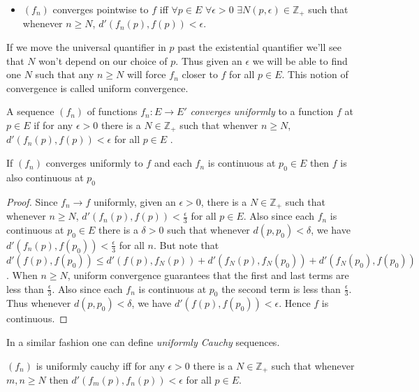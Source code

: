\begin{itemize}
    \item $\left(f_n\right)$ converges pointwise to $f$ iff $\forall p \in E$ $\forall \epsilon > 0$
	$\exists N(p,\epsilon) \in \mathbb{Z}_+$ such that whenever $n \geq N$, $d'(f_n(p),f(p)) < 
	\epsilon$.
\end{itemize}
If we move the universal quantifier in $p$ past the existential quantifier we'll see that $N$ won't
depend on our choice of $p$. Thus given an $\epsilon$ we will be able to find one $N$ such that
any $n \geq N$ will force $f_n$ closer to $f$ for all $p \in E$. This notion of convergence is 
called uniform convergence.
\begin{Definition}
    A sequence $\left(f_n\right)$ of functions $f_n : E \to E'$ \emph{converges uniformly } to
    a function $f$ at $p \in E$ if for any $\epsilon > 0$ there is a $N \in \mathbb{Z}_+$ such that 
    whenver $n \geq N$, $d'(f_n(p) ,f(p)) < \epsilon$ for all $p \in E$ . 
\end{Definition}
\begin{Theorem}[name=Uniform convergence and continuity]
    If $\left(f_n\right)$ converges uniformly to $f$ and each $f_n$ is continuous at $p_0 \in E$ 
    then $f$ is also continuous at $p_0$
\end{Theorem}
\begin{proof}
    Since $f_n \to f$ uniformly, given an $\epsilon > 0$, there is a $N \in \mathbb{Z}_+$ such that
    whenever $n \geq N$, $d'(f_n(p),f(p)) < \frac{\epsilon}{3}$ for all $p \in E$. Also since 
    each $f_n$ is continuous at
    $p_0 \in E$ there is a $\delta > 0$ such that whenever $d(p,p_0) < \delta$, we have 
    $d'(f_n(p),f(p_0)) < \frac{\epsilon}{3}$ for all
    $n$. 
    But note that $d'(f(p),f(p_0)) \leq d'(f(p),f_N(p)) + d'(f_N(p),f_N(p_0)) +
    d'(f_N(p_0),f(p_0))$. When $n \geq N$, uniform convergence guarantees that the first and last
    terms are less than $\frac{\epsilon}{3}$. Also since each $f_n$ is continuous at $p_0$ the
    second term is less than $\frac{\epsilon}{3}$. Thus whenever $d(p,p_0) < \delta$, we have 
    $d'(f(p),f(p_0)) < \epsilon$. Hence $f$ is continuous.
\end{proof}
In a similar fashion one can define \emph{uniformly Cauchy} sequences.
\begin{Definition}
    $\left(f_n\right)$ is uniformly cauchy iff for any $\epsilon > 0$ there is a $N \in
    \mathbb{Z}_+$ such that whenever $m,n \geq N$ then $d'(f_m(p),f_n(p)) < \epsilon$ for all $p \in
    E$.
\end{Definition}
